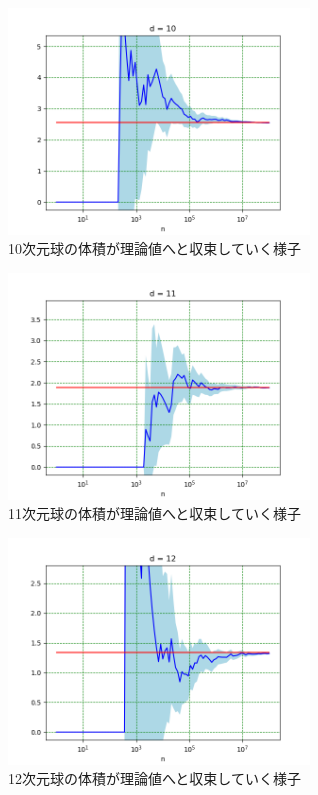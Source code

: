 \documentclass[a4paper,twoside]{jarticle}
\begin{document}
\begin{figure}[H]
\begin{center}
\includegraphics[width=8cm]{../python/report1_monte_carlo/out/r2plot10d.png}
\end{center}
\caption{10次元球の体積が理論値へと収束していく様子}
\end{figure}

\begin{figure}[H]
\begin{center}
\includegraphics[width=8cm]{../python/report1_monte_carlo/out/r2plot11d.png}
\end{center}
\caption{11次元球の体積が理論値へと収束していく様子}
\end{figure}

\begin{figure}[H]
\begin{center}
\includegraphics[width=8cm]{../python/report1_monte_carlo/out/r2plot12d.png}
\end{center}
\caption{12次元球の体積が理論値へと収束していく様子}
\end{figure}
\end{document}
